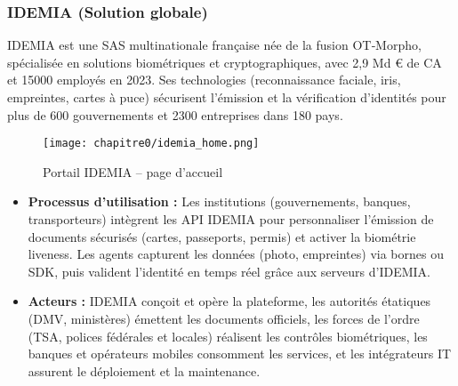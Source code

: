 \subsubsection{IDEMIA (Solution globale)}
IDEMIA\cite{b3,b30} est une SAS multinationale française née de la fusion OT‑Morpho\cite{b31}, spécialisée en solutions biométriques et cryptographiques, avec 2{,}9 Md € de CA et 15000 employés en 2023\cite{b32}. Ses technologies (reconnaissance faciale, iris, empreintes, cartes à puce) sécurisent l’émission et la vérification d’identités pour plus de 600 gouvernements et 2300 entreprises dans 180 pays\cite{b33}.\\
\begin{figure}[H]
  \centering
  \texttt{[image: chapitre0/idemia\_home.png]}
  \caption{Portail IDEMIA – page d’accueil}
\end{figure}
\begin{itemize}[label=\textbullet]
  \item \textbf{Processus d'utilisation :} Les institutions (gouvernements, banques, transporteurs) intègrent les API IDEMIA pour personnaliser l’émission de documents sécurisés (cartes, passeports, permis) et activer la biométrie liveness\cite{b34}. Les agents capturent les données (photo, empreintes) via bornes ou SDK, puis valident l’identité en temps réel grâce aux serveurs d’IDEMIA\cite{b34}.
  \item \textbf{Acteurs :} IDEMIA conçoit et opère la plateforme, les autorités étatiques (DMV, ministères) émettent les documents officiels, les forces de l’ordre (TSA, polices fédérales et locales) réalisent les contrôles biométriques, les banques et opérateurs mobiles consomment les services, et les intégrateurs IT assurent le déploiement et la maintenance\cite{b35}.
\end{itemize}

